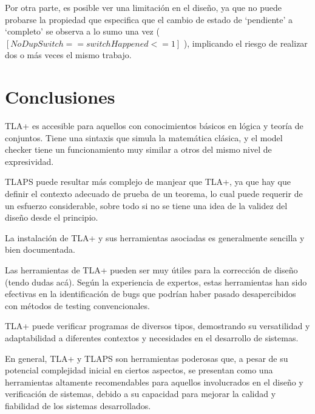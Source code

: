 \documentclass[runningheads]{llncs}
\begin{document}
%
Por otra parte, es posible ver una limitación en el diseño, ya que no puede probarse la propiedad que especifica que el cambio de estado de ‘pendiente’ a ‘completo’ se observa a lo sumo una vez ( \([NoDupSwitch == switchHappened <= 1]\) ), implicando el riesgo de realizar dos o más veces el mismo trabajo.

\section{Conclusiones}

TLA+ es accesible para aquellos con conocimientos básicos en lógica y teoría de conjuntos. Tiene una sintaxis que simula la matemática clásica, y el model checker tiene un funcionamiento muy similar a otros del mismo nivel de expresividad.

TLAPS puede resultar más complejo de manjear que TLA+, ya que hay que definir el contexto adecuado de prueba de un teorema, lo cual puede requerir de un esfuerzo considerable, sobre todo si no se tiene una idea de la validez del diseño desde el principio. 

La instalación de TLA+ y sus herramientas asociadas es generalmente sencilla y bien documentada.

Las herramientas de TLA+ pueden ser muy útiles para la corrección de diseño (tendo dudas acá). Según la experiencia de expertos, estas herramientas han sido efectivas en la identificación de bugs que podrían haber pasado desapercibidos con métodos de testing convencionales.

TLA+ puede verificar programas de diversos tipos, demostrando su versatilidad y adaptabilidad a diferentes contextos y necesidades en el desarrollo de sistemas.

En general, TLA+ y TLAPS son herramientas poderosas que, a pesar de su potencial complejidad inicial en ciertos aspectos, se presentan como una herramientas altamente recomendables para aquellos involucrados en el diseño y verificación de sistemas, debido a su capacidad para mejorar la calidad y fiabilidad de los sistemas desarrollados. 
\end{document}
